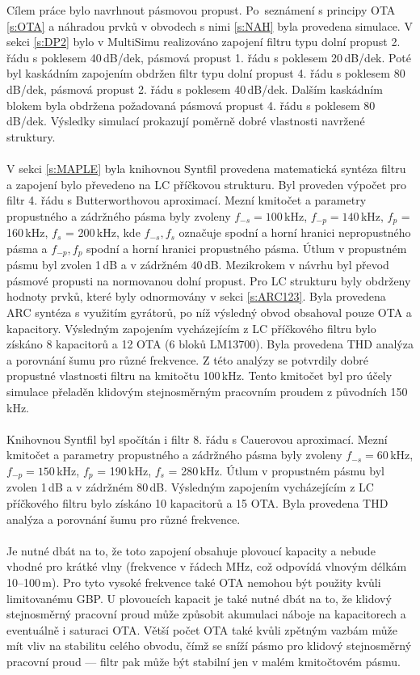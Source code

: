 \noindent Cílem práce bylo navrhnout pásmovou propust. Po~seznámení s principy OTA \ref{s:OTA} a náhradou prvků v obvodech s nimi \ref{s:NAH} byla provedena simulace. V sekci \ref{s:DP2} bylo v MultiSimu realizováno zapojení filtru typu dolní propust 2. řádu s poklesem 40\,dB/dek, pásmová propust 1. řádu s poklesem 20\,dB/\mbox{dek}. Poté byl kaskádním zapojením obdržen filtr typu dolní propust 4. řádu s poklesem 80\,dB/dek, pásmová propust 2. řádu s poklesem 40\,dB/dek. Dalším kaskádním blokem byla obdržena požadovaná pásmová propust 4. řádu s poklesem 80\,dB/dek. Výsledky simulací prokazují poměrně dobré vlastnosti navržené struktury.\\
\\
V sekci \ref{s:MAPLE} byla knihovnou Syntfil provedena matematická syntéza filtru a zapojení bylo převedeno na LC příčkovou strukturu. Byl proveden výpočet pro filtr 4. řádu s Butterworthovou aproximací. Mezní kmitočet a parametry propustného a zádržného pásma byly zvoleny $f_{-s} = 100$\,kHz, $f_{-p} = 140$\,kHz, 
$f_p$ = 160\,kHz, $f_s$ = 200\,kHz, kde $f_{-s}, f_s$ označuje spodní a horní hranici nepropustného pásma a $f_{-p}, f_p$ spodní a horní hranici propustného pásma. Útlum v propustném pásmu byl zvolen 1\,dB a v zádržném 40\,dB. Mezikrokem v návrhu byl převod pásmové propusti na normovanou dolní propust. Pro LC strukturu byly obdrženy hodnoty prvků, které byly odnormovány v sekci \ref{s:ARC123}. Byla provedena ARC syntéza s využitím gyrátorů, po níž výsledný obvod obsahoval pouze OTA a kapacitory. Výsledným zapojením vycházejícím z LC příčkového filtru bylo získáno 8 kapacitorů a 12 OTA (6 bloků LM13700). Byla provedena THD analýza a porovnání šumu pro různé frekvence. Z této analýzy se potvrdily dobré propustné vlastnosti filtru na kmitočtu 100\,kHz. Tento kmitočet byl pro účely simulace přeladěn klidovým stejnosměrným pracovním proudem z původních 150\,kHz. \\
\\
Knihovnou Syntfil byl spočítán i filtr 8. řádu s Cauerovou aproximací. Mezní kmitočet a parametry propustného a zádržného pásma byly zvoleny $f_{-s} = 60$\,kHz, $f_{-p} = 150$\,kHz, 
$f_p$ = 190\,kHz, $f_s$ = 280\,kHz. Útlum v propustném pásmu byl zvolen 1\,dB a v zádržném 80\,dB. Výsledným zapojením vycházejícím z LC příčkového filtru bylo získáno 10 kapacitorů a 15 OTA. Byla provedena THD analýza a porovnání šumu pro různé frekvence.\\
\\
Je nutné dbát na to, že toto zapojení obsahuje plovoucí kapacity a nebude vhodné pro krátké vlny (frekvence v řádech MHz, což odpovídá vlnovým délkám 10--100\,m). Pro tyto vysoké frekvence také OTA nemohou být použity kvůli limitovanému GBP. U plovoucích kapacit je také nutné dbát na to, že klidový stejnosměrný pracovní proud může způsobit akumulaci náboje na kapacitorech a eventuálně i saturaci OTA. Větší počet OTA také kvůli zpětným vazbám může mít vliv na stabilitu celého obvodu, čímž se sníží pásmo pro klidový stejnosměrný pracovní proud --- filtr pak může být stabilní jen v malém kmitočtovém pásmu.\\
